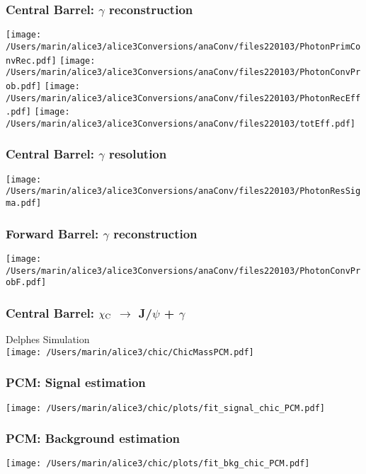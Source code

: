 \documentclass[final,hyperref={pdfpagelabels=false},aspectratio=169,t]{beamer}
\begin{document}
\begin{frame}
\frametitle{Central Barrel: $\gamma$ reconstruction} 
\texttt{[image: /Users/marin/alice3/alice3Conversions/anaConv/files220103/PhotonPrimConvRec.pdf]}
\texttt{[image: /Users/marin/alice3/alice3Conversions/anaConv/files220103/PhotonConvProb.pdf]}
\texttt{[image: /Users/marin/alice3/alice3Conversions/anaConv/files220103/PhotonRecEff.pdf]}
\texttt{[image: /Users/marin/alice3/alice3Conversions/anaConv/files220103/totEff.pdf]}
\end{frame}

\begin{frame}
\frametitle{Central Barrel: $\gamma$ resolution} 


\texttt{[image: /Users/marin/alice3/alice3Conversions/anaConv/files220103/PhotonResSigma.pdf]}
\end{frame}

\begin{frame}
\frametitle{Forward Barrel: $\gamma$ reconstruction} 

\texttt{[image: /Users/marin/alice3/alice3Conversions/anaConv/files220103/PhotonConvProbF.pdf]}
\end{frame}

\begin{frame}
\frametitle{Central Barrel: $\chi_{\rm C}$ $\rightarrow$ J/$\psi$ + $\gamma$} 

Delphes Simulation\\
\centering
\texttt{[image: /Users/marin/alice3/chic/ChicMassPCM.pdf]}

\end{frame}



\begin{frame}
\frametitle{PCM: Signal  estimation} 
\centering
\texttt{[image: /Users/marin/alice3/chic/plots/fit\_signal\_chic\_PCM.pdf]}\\
\end{frame}

\begin{frame}
\frametitle{PCM: Background estimation} 
\centering
\texttt{[image: /Users/marin/alice3/chic/plots/fit\_bkg\_chic\_PCM.pdf]}
\end{frame}
\end{document}

